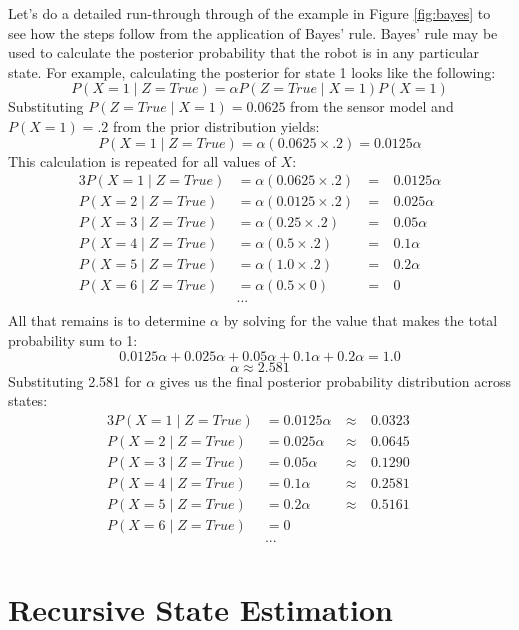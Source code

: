 Let's do a detailed run-through through of the example in Figure
\ref{fig:bayes} to see how the steps follow from the
application of Bayes' rule. Bayes' rule may be used to calculate the
posterior probability that the robot is in any particular state.  For
example, calculating the posterior for state 1 looks like the
following:
\[ P(X=1 \mid Z=True) = \alpha P(Z=True \mid X=1) P(X=1) \]
Substituting  $P(Z=True \mid X=1) = 0.0625$ from the sensor model and  $P(X=1) = .2$ from the prior distribution yields:
\[ P(X=1 \mid Z=True) = \alpha ( 0.0625 \times .2) = 0.0125\alpha   \]
This calculation is repeated for all values of $X$:
\begin{alignat*}{3}
P(X=1 \mid Z=True) &=\alpha ( 0.0625 \times .2) ~&=&~ 0.0125\alpha   \\
P(X=2 \mid Z=True) &=\alpha ( 0.0125 \times .2) ~&=&~ 0.025\alpha   \\
P(X=3 \mid Z=True) &=\alpha ( 0.25 \times .2) ~&=&~ 0.05\alpha   \\
P(X=4 \mid Z=True) &=\alpha ( 0.5 \times .2) ~&=&~ 0.1\alpha   \\
P(X=5 \mid Z=True) &=\alpha ( 1.0 \times .2) ~&=&~ 0.2\alpha   \\
P(X=6 \mid Z=True) &=\alpha ( 0.5 \times 0) ~&=&~ 0   \\
&...&& \\
\end{alignat*}
All that remains is to determine $\alpha$ by solving for the value
that makes the total probability sum to 1:
\[0.0125\alpha +  0.025\alpha + 0.05\alpha  + 0.1\alpha + 0.2\alpha  = 1.0\]
\[\alpha \approx 2.581\]
Substituting 2.581 for $\alpha$ gives us the final posterior probability distribution across states:
\begin{alignat*}{3}
P(X=1 \mid Z=True) &= 0.0125\alpha  ~&\approx&~ 0.0323   \\
P(X=2 \mid Z=True) &= 0.025\alpha  ~&\approx&~ 0.0645   \\
P(X=3 \mid Z=True) &= 0.05\alpha  ~&\approx&~ 0.1290   \\
P(X=4 \mid Z=True) &= 0.1\alpha ~&\approx&~ 0.2581  \\
P(X=5 \mid Z=True) &= 0.2\alpha ~&\approx&~ 0.5161\   \\
P(X=6 \mid Z=True) &=0 &&   \\
&...&& \\
\end{alignat*}


\section{Recursive State Estimation}
\label{sec:recursive_estimation}


